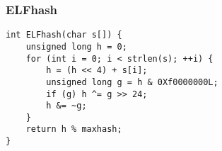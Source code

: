 \subsubsection{ELFhash}
\begin{verbatim}
int ELFhash(char s[]) {
    unsigned long h = 0;
    for (int i = 0; i < strlen(s); ++i) {
        h = (h << 4) + s[i];
        unsigned long g = h & 0Xf0000000L;
        if (g) h ^= g >> 24;
        h &= ~g;
    }
    return h % maxhash;
}
\end{verbatim}
